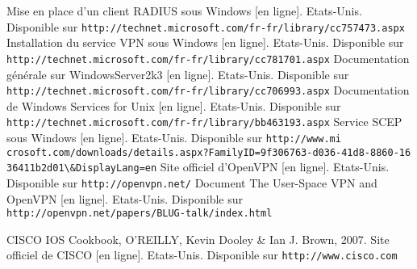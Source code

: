 \renewcommand{\bibname}{Bibliographie}
\renewcommand{\refname}{Bibliographie}

\begin{thebibliography}{Bibliographie}

	 Mise en place d'un client RADIUS sous Windows [en ligne]. Etats-Unis. Disponible sur \verb|http://technet.microsoft.com/fr-fr/library/cc757473.aspx|
	 Installation du service VPN sous Windows [en ligne]. Etats-Unis. Disponible sur \verb|http://technet.microsoft.com/fr-fr/library/cc781701.aspx|
	 Documentation générale sur WindowsServer2k3 [en ligne]. Etats-Unis. Disponible sur \verb|http://technet.microsoft.com/fr-fr/library/cc706993.aspx|
	 Documentation de Windows Services for Unix [en ligne]. Etats-Unis. Disponible sur \verb|http://technet.microsoft.com/fr-fr/library/bb463193.aspx|
	 Service SCEP sous Windows [en ligne]. Etats-Unis. Disponible sur \verb|http://www.mi| \verb|crosoft.com/downloads/details.aspx?FamilyID=9f306763-d036-41d8-8860-16| \verb|36411b2d01\&DisplayLang=en|
	 Site officiel d'OpenVPN [en ligne]. Etats-Unis. Disponible sur \verb|http://openvpn.net/|
	 Document The User-Space VPN and OpenVPN [en ligne]. Etats-Unis. Disponible sur \verb|http://openvpn.net/papers/BLUG-talk/index.html|

	 CISCO IOS Cookbook, O'REILLY, Kevin Dooley \& Ian J. Brown, 2007.
	 Site officiel de CISCO [en ligne]. Etats-Unis. Disponible sur \verb|http://www.cisco.com|
\end{thebibliography}

\pagebreak
